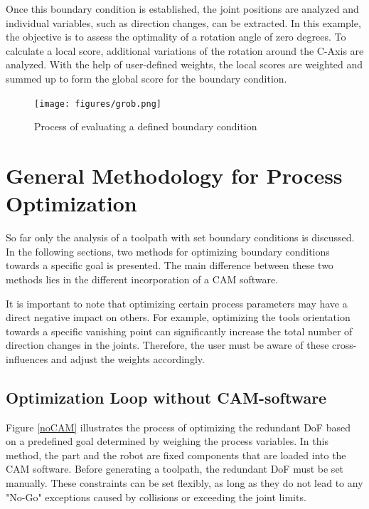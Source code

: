 Once this boundary condition is established, the joint positions are analyzed and individual variables, such as direction changes, can be extracted. In this example, the objective is to assess the optimality of a rotation angle of zero degrees.
To calculate a local score, additional variations of the rotation around the C-Axis are analyzed. With the help of user-defined weights, the local scores are weighted and summed up to form the global score for the boundary condition.


\begin{figure}[H]
	\centerline{\texttt{[image: figures/grob.png]}}
	\caption{Process of evaluating a defined boundary condition}
	\label{grob}
\end{figure}

















\section{General Methodology for Process Optimization}
So far only the analysis of a toolpath with set boundary conditions is discussed. In the following sections, two methods for optimizing boundary conditions towards a specific goal is presented. The main difference between these two methods lies in the different incorporation of a \acrshort{CAM} software.

It is important to note that optimizing certain process parameters may have a direct negative impact on others. For example, optimizing the tools orientation towards a specific vanishing point can significantly increase the total number of direction changes in the joints. Therefore, the user must be aware of these cross-influences and adjust the weights accordingly.

\subsection{Optimization Loop without CAM-software}\label{noCAMchap}

Figure \ref{noCAM} illustrates the process of optimizing the redundant \acrshort{DoF} based on a predefined goal determined by weighing the process variables. In this method, the part and the robot are fixed components that are loaded into the \acrshort{CAM} software. Before generating a toolpath, the redundant \acrshort{DoF} must be set manually. These constraints can be set flexibly, as long as they do not lead to any "No-Go" exceptions caused by collisions or exceeding the joint limits.

